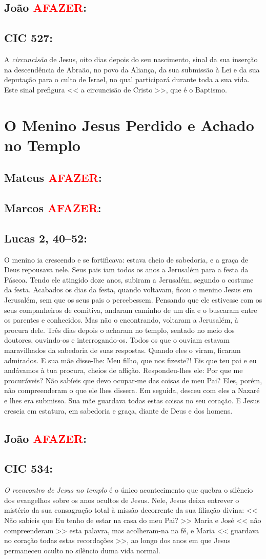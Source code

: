 \documentclass[10pt,a5paper]{book}
\newcommand{\from}[1]{\subsection*{#1}}
\newcommand{\TODO}{\textcolor{red}{\ttfamily AFAZER}}
\begin{document}
\from{João \TODO:}

\from{CIC 527:}

A \emph{circuncisão} de Jesus, oito dias depois do seu nascimento, sinal da sua inserção na descendência de Abraão, no povo da Aliança, da sua submissão à Lei e da sua deputação para o culto de Israel, no qual participará durante toda a sua vida.
Este sinal prefigura << a circuncisão de Cristo >>, que é o Baptismo.


\section{O Menino Jesus Perdido e Achado no Templo}

\from{Mateus \TODO:}

\from{Marcos \TODO:}

\from{Lucas 2, 40--52:}

O menino ia crescendo e se fortificava:
estava cheio de sabedoria, e a graça de Deus repousava nele.
Seus pais iam todos os anos a Jerusalém para a festa da Páscoa.
Tendo ele atingido doze anos, subiram a Jerusalém, segundo o costume da festa.
Acabados os dias da festa, quando voltavam, ficou o menino Jesus em Jerusalém, sem que os seus pais o percebessem.
Pensando que ele estivesse com os seus companheiros de comitiva, andaram caminho de um dia e o buscaram entre os parentes e conhecidos.
Mas não o encontrando, voltaram a Jerusalém, à procura dele.
Três dias depois o acharam no templo, sentado no meio dos doutores, ouvindo-os e interrogando-os.
Todos os que o ouviam estavam maravilhados da sabedoria de suas respostas.
Quando eles o viram, ficaram admirados.
E sua mãe disse-lhe:
Meu filho, que nos fizeste?! Eis que teu pai e eu andávamos à tua procura, cheios de aflição.
Respondeu-lhes ele:
Por que me procuráveis? Não sabíeis que devo ocupar-me das coisas de meu Pai?
Eles, porém, não compreenderam o que ele lhes dissera.
Em seguida, desceu com eles a Nazaré e lhes era submisso.
Sua mãe guardava todas estas coisas no seu coração.
E Jesus crescia em estatura, em sabedoria e graça, diante de Deus e dos homens.

\from{João \TODO:}

\from{CIC 534:}

\emph{O reencontro de Jesus no templo} é o único acontecimento que quebra o silêncio dos evangelhos sobre os anos ocultos de Jesus.
Nele, Jesus deixa entrever o mistério da sua consagração total à missão decorrente da sua filiação divina:
<< Não sabíeis que Eu tenho de estar na casa do meu Pai? >>
Maria e José << não compreenderam >> esta palavra, mas acolheram-na na fé, e Maria << guardava no coração todas estas recordações >>, ao longo dos anos em que Jesus permaneceu oculto no silêncio duma vida normal.
\end{document}
